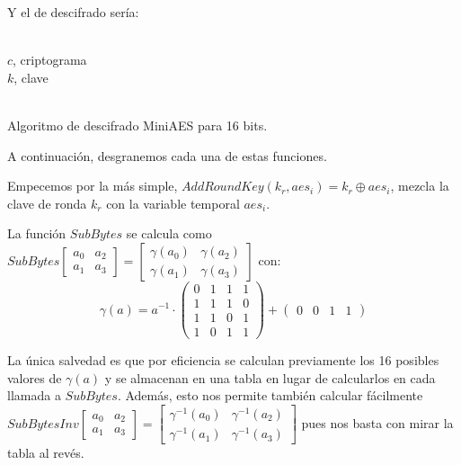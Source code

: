 	Y el de descifrado sería:	
	\begin{algorithm}[H]
		\begin{algorithmic}[1]
			\REQUIRE \ \\
				\texttt{$c$}, criptograma \\
				\texttt{$k$}, clave\\ \

		\end{algorithmic}
		\caption{Algoritmo de descifrado MiniAES para 16 bits.}
		\label{DecMiniAES}
	\end{algorithm}
	
	A continuación, desgranemos cada una de estas funciones.
	
	Empecemos por la más simple, $AddRoundKey(k_r, aes_i) = k_r \oplus aes_i$, mezcla la clave de ronda $k_r$
	con la variable temporal $aes_i$.
	
	La función $SubBytes$ se calcula como $SubBytes \left[\begin{matrix}a_0 & a_2\\ a_1 & a_3\end{matrix}\right]
	= \left[\begin{matrix}\gamma(a_0) & \gamma(a_2) \\ \gamma(a_1) & \gamma(a_3)\end{matrix}\right]$ con:
	$$\gamma(a) = a^{-1} \cdot \left(\begin{matrix} 0 & 1 & 1 & 1 \\ 1 & 1 & 1 & 0 \\ 1 & 1 & 0 & 1 \\
	1 & 0 & 1 & 1 \end{matrix}\right) + \left(\begin{matrix} 0 & 0 & 1 & 1 \end{matrix}\right)$$
	
	La única salvedad es que por eficiencia se calculan previamente los 16 posibles valores de $\gamma(a)$ y se
	almacenan en una tabla en lugar de calcularlos en cada llamada a $SubBytes$. Además, esto nos permite también
	calcular fácilmente $SubBytesInv \left[\begin{matrix}a_0 & a_2\\ a_1 & a_3\end{matrix}\right] =
	\left[\begin{matrix}\gamma^{-1}(a_0) & \gamma^{-1}(a_2) \\ \gamma^{-1}(a_1) & \gamma^{-1}(a_3)\end{matrix}\right]$
	pues nos basta con mirar la tabla al revés.
	

